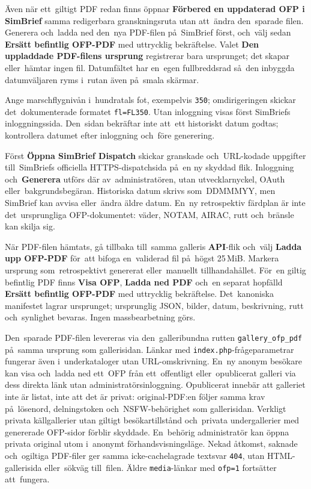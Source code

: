 \documentclass[11pt,a4paper]{article}
\newcommand{\ui}[1]{\textbf{#1}}
\newcommand{\codeword}[1]{\nolinkurl{#1}}
\begin{document}
Även när ett~giltigt PDF redan finns öppnar \ui{Förbered en uppdaterad OFP i
SimBrief} samma redigerbara granskningsruta utan att~ändra den~sparade filen.
Generera och~ladda ned den~nya PDF-filen på~SimBrief först, och~välj sedan
\ui{Ersätt befintlig OFP-PDF} med uttrycklig bekräftelse. Valet \ui{Den
uppladdade PDF-filens ursprung} registrerar bara ursprunget; det skapar
eller~hämtar ingen fil. Datumfältet har en~egen fullbreddsrad så~den inbyggda
datumväljaren ryms i~rutan även på~smala skärmar.

Ange marschflygnivån i~hundratals fot, exempelvis \codeword{350}; omdirigeringen
skickar det~dokumenterade formatet \codeword{fl=FL350}. Utan inloggning visas
först SimBriefs inloggningssida. Den~sidan bekräftar inte att~ett historiskt
datum godtas; kontrollera datumet efter inloggning och~före generering.

Först \ui{Öppna SimBrief Dispatch} skickar granskade och~URL-kodade uppgifter
till~SimBriefs officiella HTTPS-dispatchsida på~en ny skyddad flik. Inloggning
och~\ui{Generera} utförs där av~administratören, utan utvecklarnyckel, OAuth
eller~bakgrundsbegäran. Historiska datum skrivs som~DDMMMYY, men SimBrief kan
avvisa eller~ändra äldre datum. En~ny retrospektiv färdplan är inte
det~ursprungliga OFP-dokumentet: väder, NOTAM, AIRAC, rutt och~bränsle kan
skilja sig.

När PDF-filen hämtats, gå tillbaka till~samma galleris \ui{API}-flik och~välj
\ui{Ladda upp OFP-PDF} för~att bifoga en~validerad fil på~högst 25\,MiB. Markera
ursprung som~retrospektivt genererat eller~manuellt tillhandahållet. För~en
giltig befintlig PDF finns \ui{Visa OFP}, \ui{Ladda ned PDF} och~en separat
hopfälld \ui{Ersätt befintlig OFP-PDF} med uttrycklig bekräftelse. Det~kanoniska
manifestet lagrar ursprunget; ursprunglig JSON, bilder, datum, beskrivning, rutt
och~synlighet bevaras. Ingen massbearbetning görs.

Den~sparade PDF-filen levereras via den~galleribundna rutten
\codeword{gallery\_ofp\_pdf} på~samma ursprung som gallerisidan. Länkar med
\codeword{index.php}-frågeparametrar fungerar även i~underkataloger utan
URL-omskrivning. En~ny anonym besökare kan visa och~ladda ned ett~OFP från
ett~offentligt eller~opublicerat galleri via dess direkta länk utan
administratörsinloggning. Opublicerat innebär att galleriet inte är listat, inte
att det är privat: original-PDF:en följer samma krav på~lösenord, delningstoken
och~NSFW-behörighet som gallerisidan. Verkligt privata källgallerier utan
giltigt besökartillstånd och~privata undergallerier med genererade OFP-sidor
förblir skyddade. En~behörig administratör kan öppna privata original utom
i~anonymt förhandsvisningsläge. Nekad åtkomst, saknade och~ogiltiga PDF-filer
ger samma icke-cachelagrade textsvar \codeword{404}, utan HTML-gallerisida
eller~sökväg till~filen. Äldre \codeword{media}-länkar med \codeword{ofp=1}
fortsätter att~fungera.
\end{document}
